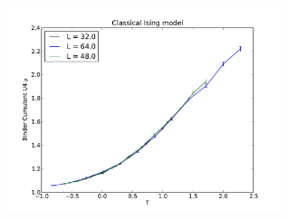 \href{http://alps.comp-phys.org/vistrails/download.php?getvt=15&db=vistrails&host=alps.comp-phys.org&port=3306&tag=&execute=True&showspreadsheetonly=True&embedWorkflow=True&includeFullTree=False&version=332}{\includegraphics[width=8cm]{vistrails_images/alps.comp-phys.org_vistrails_3306_15_332_pdf/alps_paper_exploration_332.pdf}
}